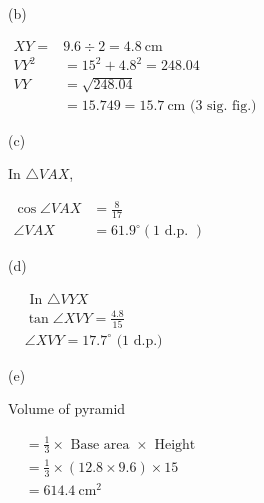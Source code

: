 \documentclass[twocolumn]{article}
\begin{document}
\noindent
(b) 

\noindent
$\begin{aligned} X Y= & 9.6 \div 2=4.8 \mathrm{~cm} \\ V Y^2 & =15^2+4.8^2 =248.04 \\ V Y & =\sqrt{248.04} \\ & =15.749 =15.7 \mathrm{~cm} \text { (3 sig. fig.) }\end{aligned}$

\noindent
(c) 

\noindent
In $\triangle V A X$,

$
\begin{aligned}
	\cos \angle V A X & =\frac{8}{17} \\
	\angle V A X & =61.9^{\circ}(1 \text { d.p. })
\end{aligned}
$

\noindent
(d) 

\noindent
$\begin{aligned} & \text { In } \triangle V Y X \\ & \tan \angle X V Y=\frac{4.8}{15} \\ & \angle X V Y=1 7 . 7^{\circ} \text { (1 d.p.) }\end{aligned}$

\noindent
(e) 

\noindent
Volume of pyramid

$
\begin{aligned}
	& =\frac{1}{3} \times \text { Base area } \times \text { Height } \\
	& =\frac{1}{3} \times(12.8 \times 9.6) \times 15 \\
	& =614.4 \mathrm{~cm}^2
\end{aligned}
$
\end{document}
